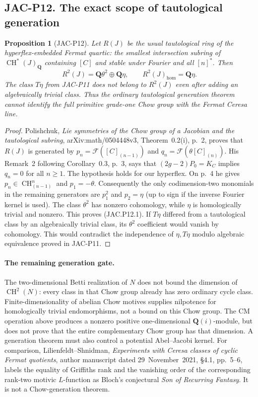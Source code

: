 \documentclass[11pt,a4paper]{article}
\newtheorem{proposition}[theorem]{Proposition}
\begin{document}
\subsection*{JAC-P12. The exact scope of tautological generation}

\begin{proposition}[JAC-P12]\label{jac:P12}
Let $R(J)$ be the usual tautological ring of the hyperflex-embedded
Fermat quartic: the smallest intersection subring of
$\operatorname{CH}^*(J)_{\mathbf Q}$ containing $[C]$ and stable
under Fourier and all $[n]^*$. Then
\[
 R^2(J)=\mathbf Q\theta^2\oplus\mathbf Q\eta,\qquad
 R^2(J)_{\mathrm{hom}}=\mathbf Q\eta.                  \tag{JAC.P12.1}
\]
The class $T\eta$ from JAC-P11 does not belong to $R^2(J)$ even
after adding an algebraically trivial class. Thus the ordinary
tautological generation theorem cannot identify the full primitive
grade-one Chow group with the Fermat Ceresa line.
\end{proposition}

\begin{proof}
Polishchuk, \emph{Lie symmetries of the Chow group of a Jacobian
and the tautological subring}, arXiv:math/0504448v3,
Theorem~0.2(i), p.~2, proves that $R(J)$ is generated by
$p_n=\mathcal F([C]_{(n-1)})$ and
$q_n=\mathcal F(\theta[C]_{(n)})$.
His Remark~2 following Corollary~0.3, p.~3, says that
$(2g-2)P_0=K_C$ implies $q_n=0$ for all $n\ge1$.
The hypothesis holds for our hyperflex. On p.~4 he gives
$p_n\in\operatorname{CH}^n_{(n-1)}$ and $p_1=-\theta$.
Consequently the only codimension-two monomials in the remaining
generators are $p_1^2$ and $p_2=\eta$ (up to sign if the inverse
Fourier kernel is used). The class $\theta^2$ has nonzero
cohomology, while $\eta$ is homologically trivial and nonzero.
This proves (JAC.P12.1).
If $T\eta$ differed from a tautological class by an algebraically
trivial class, its $\theta^2$ coefficient would vanish by cohomology.
This would contradict the independence of $\eta,T\eta$ modulo
algebraic equivalence proved in JAC-P11.
\end{proof}

\paragraph{The remaining generation gate.}
The two-dimensional Betti realization of $N$ does not bound the
dimension of $\operatorname{CH}^2(N)$: every class in that Chow
group already has zero ordinary cycle class.
Finite-dimensionality of abelian Chow motives supplies nilpotence
for homologically trivial endomorphisms, not a bound on this Chow
group. The CM operation above produces a nonzero positive
one-dimensional $\mathbf Q(i)$-module, but does not prove that
the entire complementary Chow group has that dimension.
A generation theorem must also control a potential Abel--Jacobi
kernel. For comparison, Lilienfeldt--Shnidman,
\emph{Experiments with Ceresa classes of cyclic Fermat quotients},
author manuscript dated 29~November~2021, \S4.1, pp.~5--6,
labels the equality of Griffiths rank and the vanishing order of
the corresponding rank-two motivic $L$-function as Bloch's
conjectural \emph{Son of Recurring Fantasy}.
It is not a Chow-generation theorem.
\end{document}

